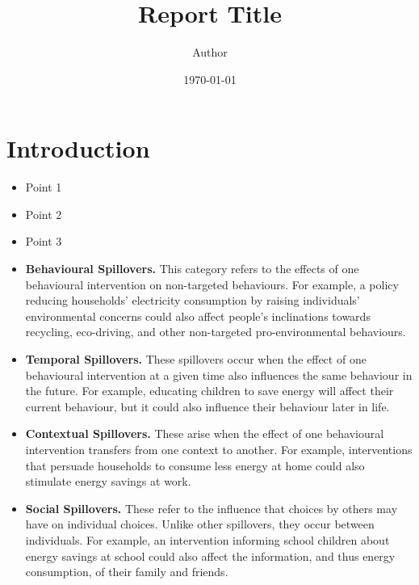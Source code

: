 \documentclass{article}
\title{\textbf{\LARGE Report Title}}
\author{\Large Author}
\date{\Large \today}
\begin{document}

\section{Introduction}
\begin{keypoints}
\begin{itemize}
  \item Point 1
  \item Point 2
  \item Point 3
\end{itemize}
\end{keypoints}

\lipsum[1] %


\begin{mybox}
    \lipsum[1] %
\end{mybox}

\begin{mybox}
    \begin{itemize}
        \item \textbf{Behavioural Spillovers.} This category refers to the effects of one behavioural intervention on non-targeted behaviours. For example, a policy reducing households' electricity consumption by raising individuals' environmental concerns could also affect people's inclinations towards recycling, eco-driving, and other non-targeted pro-environmental behaviours.
        
        \item \textbf{Temporal Spillovers.} These spillovers occur when the effect of one behavioural intervention at a given time also influences the same behaviour in the future. For example, educating children to save energy will affect their current behaviour, but it could also influence their behaviour later in life.
        
        \item \textbf{Contextual Spillovers.} These arise when the effect of one behavioural intervention transfers from one context to another. For example, interventions that persuade households to consume less energy at home could also stimulate energy savings at work.
        
        \item \textbf{Social Spillovers.} These refer to the influence that choices by others may have on individual choices. Unlike other spillovers, they occur between individuals. For example, an intervention informing school children about energy savings at school could also affect the information, and thus energy consumption, of their family and friends.
      \end{itemize}
\end{mybox}
\end{document}
